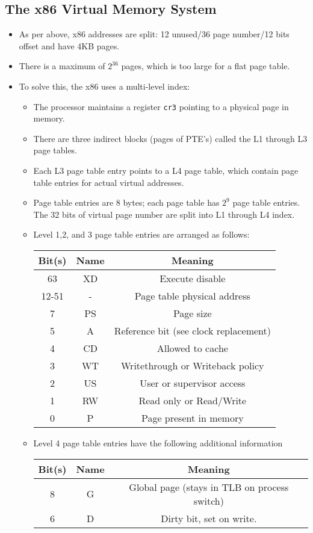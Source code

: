 \documentclass[12pt]{article}
\begin{document}
\subsection{The x86 Virtual Memory System}
\begin{itemize}
	\item As per above, x86 addresses are split: 12 unused/36 page number/12 bits offset and have 4KB pages.

	\item There is a maximum of $2^{36}$ pages, which is too large for a flat page table. 
	\item To solve this, the x86 uses a multi-level index:
		\begin{itemize}
			\item The processor maintains a register \texttt{cr3} pointing to a physical page in memory.
			\item There are three indirect blocks (pages of PTE's) called the L1 through L3 page tables. 
			\item Each L3 page table entry points to a L4 page table, which contain page table entries for actual virtual addresses. 
			\item Page table entries are 8 bytes; each page table has $2^{9}$ page table entries. The 32 bits of virtual page number are split into L1 through L4 index. 
			\item Level 1,2, and 3 page table entries are arranged as follows:
				\begin{center}
					\begin{tabular}{c||c|c}
						Bit(s) & Name & Meaning \\ 
						\hline
						63 & XD & Execute disable \\
						12-51 & - & Page table physical address \\
						7 & PS & Page size \\
						5 & A & Reference bit (see clock replacement) \\
						4 & CD & Allowed to cache \\
						3 & WT & Writethrough or Writeback policy \\
						2 & US & User or supervisor access \\
						1 & RW & Read only or Read/Write \\
						0 & P & Page present in memory
					\end{tabular} 
				\end{center}
			\newpage
		\item Level 4 page table entries have the following additional information
				\begin{center}
					\begin{tabular}{c||c|c}
						Bit(s) & Name & Meaning \\ 
						\hline
						8 & G & Global page (stays in TLB on process switch) \\
						6 & D & Dirty bit, set on write.
					\end{tabular} 
				\end{center}
	\end{itemize}
\end{itemize}
\end{document}
